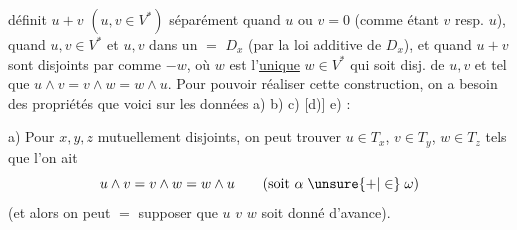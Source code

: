 définit $u+v$ $(u,v\in V^*)$ séparément quand $u$ ou $v=0$ (comme étant $v$ resp. $u$), quand $u,v\in V^*$ et $u,v$ dans un $=$ $D_x$ (par la loi additive de $D_x$), et quand $u+v$ sont disjoints par  comme $-w$, où $w$ est l'\uline{unique} $w\in V^*$ qui soit disj. de $u,v$ et tel que $u\wedge v=v\wedge w=w\wedge u$. Pour pouvoir réaliser cette construction, on a besoin des  propriétés que voici sur les données a) b) c) [d)] e) :

a) Pour $x,y,z$  mutuellement disjoints, on peut trouver $u\in T_x$, $v\in T_y$, $w\in T_z$ tels que l'on ait
\[
u\wedge v=v\wedge w=w\wedge u\qquad(\text{soit }\alpha\mathrel{\unsure{+|\in}}\omega)
\]
(et alors on peut $=$ supposer que $u$  $v$  $w$  soit donné d'avance).
